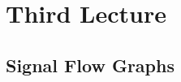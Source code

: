 \setchapterpreamble[u]{\margintoc}
\chapter{Third Lecture}

\section{Signal Flow Graphs}

\blindtext 
